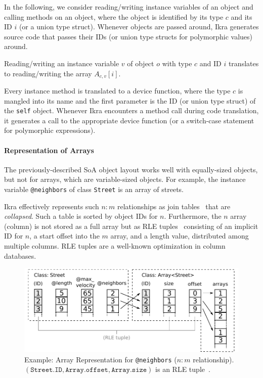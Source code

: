 \documentclass[preprint]{sigplanconf}
\begin{document}
In the following, we consider reading/writing instance variables of an object and calling methods on an object, where the object is identified by its type $c$ and its ID $i$ (or a union type struct). Whenever objects are passed around, Ikra generates source code that passes their IDs (or union type structs for polymorphic values) around.

Reading/writing an instance variable $v$ of object $o$ with type $c$ and ID $i$ translates to reading/writing the array $A_{c,v}[i]$.

Every instance method is translated to a device function, where the type $c$ is mangled into its name and the first parameter is the ID (or union type struct) of the \texttt{self} object. Whenever Ikra encounters a method call during code translation, it generates a call to the appropriate device function (or a switch-case statement for polymorphic expressions).

\paragraph{Representation of Arrays}
The previously-described SoA object layout works well with equally-sized objects, but not for arrays, which are variable-sized objects. For example, the instance variable \texttt{@neighbors} of class \texttt{Street} is an array of streets.

Ikra effectively represents such $n:m$ relationships as join tables~\cite{Garcia-Molina:2008:DSC:1450931} that are \emph{collapsed}. Such a table is sorted by object IDs for $n$. Furthermore, the $n$ array (column) is not stored as a full array but as RLE tuples~\cite{Abadi:2006:ICE:1142473.1142548} consisting of an implicit ID for $n$, a start offset into the $m$ array, and a length value, distributed among multiple columns. RLE tuples are a well-known optimization in column databases.

\begin{figure}[!htp]
    \centering
    \includegraphics[width=\columnwidth]{column_access.pdf}
    \caption{Example: Array Representation for \texttt{@neighbors} ($n:m$ relationship). $(\texttt{Street.ID}, \texttt{Array.offset}, \texttt{Array.size})$ is an RLE tuple~\cite{Abadi:2006:ICE:1142473.1142548}.}
    \label{fig:array_repr}
\end{figure}
\end{document}
